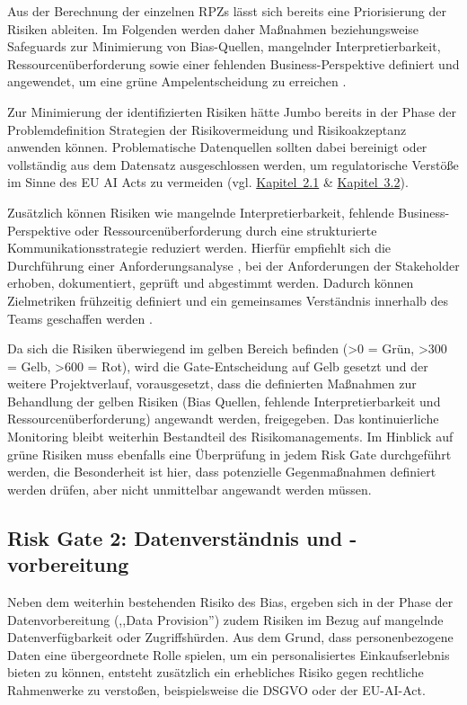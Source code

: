 Aus der Berechnung der einzelnen RPZs lässt sich bereits eine Priorisierung der Risiken ableiten. 
Im Folgenden werden daher Maßnahmen beziehungsweise Safeguards zur Minimierung von Bias-Quellen, 
mangelnder Interpretierbarkeit, Ressourcenüberforderung sowie einer fehlenden Business-Perspektive 
definiert und angewendet, um eine grüne Ampelentscheidung zu erreichen \cite{Bundesministerium_2018}. 

Zur Minimierung der identifizierten Risiken hätte Jumbo bereits in der Phase der Problemdefinition 
Strategien der Risikovermeidung und Risikoakzeptanz anwenden können. 
Problematische Datenquellen sollten dabei bereinigt oder vollständig aus dem Datensatz ausgeschlossen werden, 
um regulatorische Verstöße im Sinne des EU AI Acts zu vermeiden
(vgl. \hyperref[sec:begriffe]{Kapitel~2.1} \& \hyperref[sec:methode2]{Kapitel~3.2}).

Zusätzlich können Risiken wie mangelnde Interpretierbarkeit, fehlende Business-Perspektive 
oder Ressourcenüberforderung durch eine strukturierte Kommunikationsstrategie reduziert werden. 
Hierfür empfiehlt sich die Durchführung einer Anforderungsanalyse 
\cite{Hermann_2022}, bei der Anforderungen der Stakeholder erhoben, dokumentiert, geprüft und abgestimmt werden. 
Dadurch können Zielmetriken frühzeitig definiert und ein gemeinsames Verständnis innerhalb des Teams geschaffen werden \cite{Hermann_2022}.

Da sich die Risiken überwiegend im gelben Bereich befinden 
(>0 = Grün, >300 = Gelb, >600 = Rot), 
wird die Gate-Entscheidung auf Gelb gesetzt und der weitere Projektverlauf, vorausgesetzt, dass die definierten Maßnahmen zur Behandlung der gelben Risiken (Bias Quellen, fehlende Interpretierbarkeit und Ressourcenüberforderung) angewandt werden, freigegeben. 
Das kontinuierliche Monitoring bleibt weiterhin Bestandteil des Risikomanagements. Im Hinblick auf grüne Risiken muss ebenfalls eine Überprüfung in jedem Risk Gate durchgeführt werden, die Besonderheit ist hier, dass potenzielle Gegenmaßnahmen definiert werden drüfen, aber nicht unmittelbar angewandt werden müssen.

\subsection{Risk Gate 2: Datenverständnis und -vorbereitung}
Neben dem weiterhin bestehenden Risiko des Bias, ergeben sich in der Phase der 
Datenvorbereitung (,,Data Provision'') zudem Risiken im Bezug auf mangelnde Datenverfügbarkeit 
oder Zugriffshürden. Aus dem Grund, dass personenbezogene Daten eine übergeordnete Rolle spielen, 
um ein personalisiertes Einkaufserlebnis bieten zu können, entsteht zusätzlich ein 
erhebliches Risiko gegen rechtliche Rahmenwerke zu verstoßen, beispielsweise die DSGVO oder der EU-AI-Act. \cite{schulz_dasc-pm_2022}


